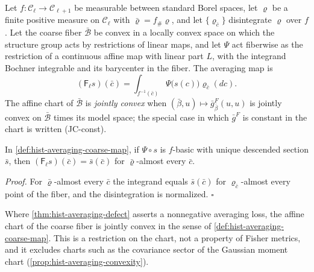 Let \(f:\mathcal C_\ell\to\mathcal C_{\ell+1}\) be measurable between standard
Borel spaces, let \(\varrho\) be a finite positive measure on \(\mathcal C_\ell\)
with \(\bar\varrho=f_\#\varrho\), and let \(\{\varrho_{\bar c}\}\) disintegrate
\(\varrho\) over \(f\). Let the coarse fiber \(\bar{\mathcal B}\) be convex in a
locally convex space on which the structure group acts by restrictions of linear
maps, and let \(\Psi\) act fiberwise as the restriction of a continuous affine map
with linear part \(L\), with the integrand Bochner integrable and its barycenter
in the fiber. The averaging map is
\begin{equation}
\left(\mathsf F_\ell s\right)(\bar c)
=\int_{f^{-1}(\bar c)}\Psi\bigl(s(c)\bigr)\varrho_{\bar c}(dc).
\label{eq:hist-averaging-coarse-map}
\end{equation}
The affine chart of \(\bar{\mathcal B}\) is \emph{jointly convex} when
\((\bar\beta,u)\mapsto\bar g^F_{\bar\beta}(u,u)\) is jointly convex on
\(\bar{\mathcal B}\) times its model space; the special case in which
\(\bar g^F\) is constant in the chart is written (JC-const).

In \cref{def:hist-averaging-coarse-map}, if \(\Psi\circ s\) is \(f\)-basic with
unique descended section \(\bar s\), then
\((\mathsf F_\ell s)(\bar c)=\bar s(\bar c)\) for \(\bar\varrho\)-almost every
\(\bar c\). 

\noindent\emph{Proof.}
For \(\bar\varrho\)-almost every \(\bar c\) the integrand equals
\(\bar s(\bar c)\) for \(\varrho_{\bar c}\)-almost every point of the fiber, and
the disintegration is normalized. \(\square\)

Where \cref{thm:hist-averaging-defect} asserts a nonnegative averaging loss, the
affine chart of the coarse fiber is jointly convex in the sense of
\cref{def:hist-averaging-coarse-map}. This is a restriction on the chart, not a
property of Fisher metrics, and it excludes charts such as the covariance sector
of the Gaussian moment chart (\cref{prop:hist-averaging-convexity}).

